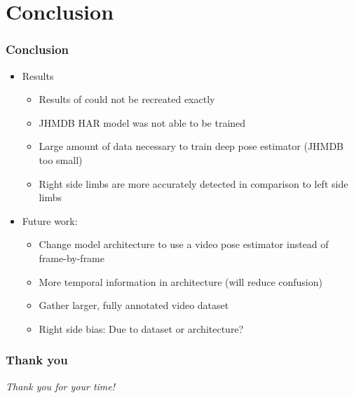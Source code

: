 \documentclass[9pt]{beamer}
\newenvironment{myframe}[1][]{%
\begin{frame}%
\frametitle{#1}
\setcounter{footnote}{0}


}{%
\end{frame}%
}
\begin{document}
\section{Conclusion}
\begin{myframe}[Conclusion]
    \begin{itemize}
        \item Results
        \begin{itemize}
            \item Results of \footnotemark[1] could not be recreated exactly
            \item JHMDB HAR model was not able to be trained
            \item Large amount of data necessary to train deep pose estimator (JHMDB too small)
            \item Right side limbs are more accurately detected in comparison to left side limbs
        \end{itemize}
        \item Future work:
        \begin{itemize}
            \item Change model architecture to use a video pose estimator instead of frame-by-frame
            \item More temporal information in architecture (will reduce confusion)
            \item Gather larger, fully annotated video dataset
            \item Right side bias: Due to dataset or architecture?
        \end{itemize}            
    \end{itemize}
\end{myframe}

\begin{myframe}[Thank you]
    \centering \Large
    \emph{Thank you for your time!}
\end{myframe}
\end{document}
